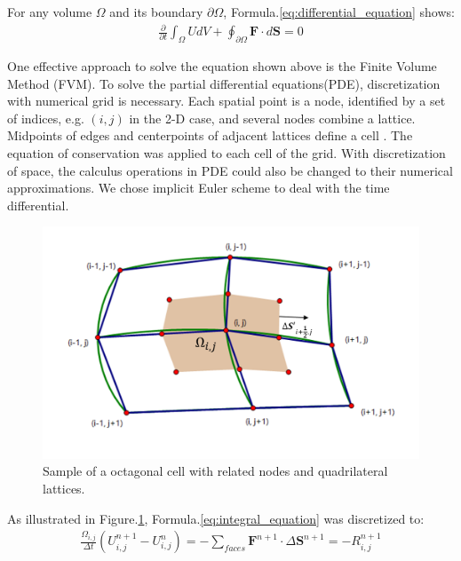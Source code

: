 \documentclass[%
 reprint,
 amsmath,amssymb,
pra,
]{revtex4-1}
\begin{document}
For any volume $\Omega$ and its boundary $\partial\Omega$, Formula.\ref{eq:differential_equation} shows:
\begin{align}\label{eq:integral_equation}
	\frac{\partial}{\partial t}\int_\Omega U d V + \oint_{\partial \Omega} \bm{F} \cdot d \bm{S} = 0
\end{align}

One effective approach to solve the equation shown above is the Finite Volume Method (FVM). To solve the partial differential equations(PDE), discretization with numerical grid is necessary. Each spatial point is a node, identified by a set of indices, e.g. $\left(i, j\right)$ in the 2-D case, and several nodes combine a lattice. Midpoints of edges and centerpoints of adjacent lattices define a cell \cite{economon2015su2}. The equation of conservation was applied to each cell of the grid. With discretization of space, the calculus operations in PDE could also be changed to their numerical approximations. We chose implicit Euler scheme to deal with the time differential.
\begin{figure}[h]
	\centering  
	\includegraphics[width=0.7\linewidth]{Fig/grid}
	\caption{Sample of a octagonal cell with related nodes and quadrilateral lattices.}
	\label{fig:sample_of_cell}
\end{figure}

As illustrated in Figure.\ref{fig:sample_of_cell}, Formula.\ref{eq:integral_equation} was discretized to:
\begin{align}
	\frac{\Omega_{i, j}}{\Delta t}\left(U^{n+1}_{i, j}-U^{n}_{i, j} \right) = -\sum_{faces}\bm{F}^{n+1}\cdot\Delta\bm{S}^{n+1} = -R^{n+1}_{i, j}
\end{align}
\end{document}
